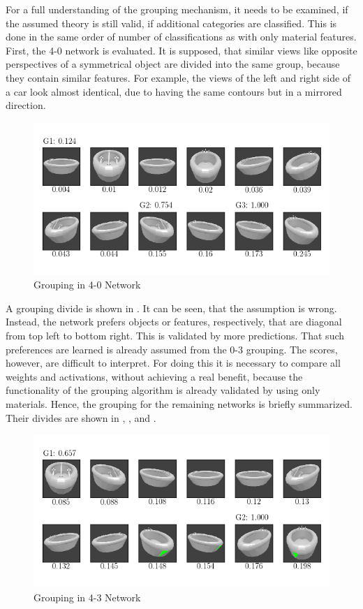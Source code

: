 For a full understanding of the grouping mechanism, it needs to be examined, if the assumed theory is still valid, if additional categories are classified.
This is done in the same order of number of classifications as with only material features.
First, the 4-0 network is evaluated.
It is supposed, that similar views like opposite perspectives of a symmetrical object are divided into the same group, because they contain similar features.
For example, the views of the left and right side of a car look almost identical, due to having the same contours but in a mirrored direction.
\begin{figure}
	\centering
	\includegraphics[trim=10 20 10 20, clip]{images/mn-sl-4-0-20/bathtub_0107_0_grouping.png}
	\caption{Grouping in 4-0 Network}
	\label{fig:grouping-4-0}
\end{figure}
A grouping divide is shown in .
It can be seen, that the assumption is wrong.
Instead, the network prefers objects or features, respectively, that are diagonal from top left to bottom right.
This is validated by more predictions.
That such preferences are learned is already assumed from the 0-3 grouping.
The scores, however, are difficult to interpret.
For doing this it is necessary to compare all weights and activations, without achieving a real benefit, because the functionality of the grouping algorithm is already validated by using only materials.
Hence, the grouping for the remaining networks is briefly summarized.
Their divides are shown in , ,  and .
\begin{figure}
	\centering
	\includegraphics[trim=10 20 10 20, clip]{images/mn-sl-4-3-20/bathtub_0107_1_grouping.png}
	\caption{Grouping in 4-3 Network}
	\label{fig:grouping-4-3}
\end{figure}
